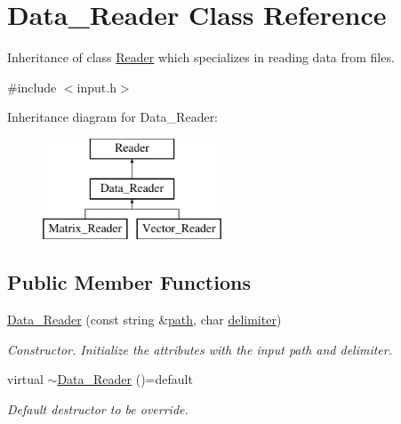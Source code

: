 \hypertarget{class_data___reader}{}\section{Data\+\_\+\+Reader Class Reference}
\label{class_data___reader}


Inheritance of class \mbox{\hyperlink{class_reader}{Reader}} which specializes in reading data from files.  




{\ttfamily \#include $<$input.\+h$>$}

Inheritance diagram for Data\+\_\+\+Reader\+:\begin{figure}[H]
\begin{center}
\leavevmode
\includegraphics[height=3.000000cm]{class_data___reader}
\end{center}
\end{figure}
\subsection*{Public Member Functions}
\begin{DoxyCompactItemize}
\item 
\mbox{\label{class_data___reader_a8ea116155d708b4516786730fdeb93bb}} 
\mbox{\hyperlink{class_data___reader_a8ea116155d708b4516786730fdeb93bb}{Data\+\_\+\+Reader}} (const string \&\mbox{\hyperlink{class_reader_a4f3eaccb117f248d4649ffb4e793a23d}{path}}, char \mbox{\hyperlink{class_data___reader_ac05700473d754089d7f30d2cc7dccce9}{delimiter}})
\begin{DoxyCompactList}\small\item\em Constructor. Initialize the attributes with the input path and delimiter. \end{DoxyCompactList}\item 
\mbox{\label{class_data___reader_a2c1fa3b33d6bc8aab051878e1d3395cf}} 
virtual \mbox{\hyperlink{class_data___reader_a2c1fa3b33d6bc8aab051878e1d3395cf}{$\sim$\+Data\+\_\+\+Reader}} ()=default
\begin{DoxyCompactList}\small\item\em Default destructor to be override. \end{DoxyCompactList}\end{DoxyCompactItemize}

